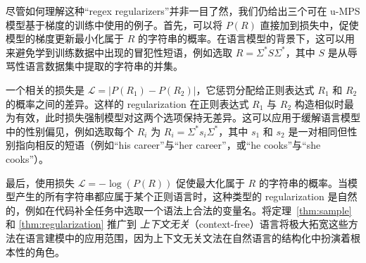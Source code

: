 \documentclass[twoside]{article}
\newcommand{\mc}[1]{\mathcal{#1}}
\begin{document}
尽管如何理解这种``regex regularizers''并非一目了然，我们仍给出三个可在 u-MPS 模型基于梯度的训练中使用的例子。首先，可以将 $P(R)$ 直接加到损失中，促使模型的梯度更新最小化属于 $R$ 的字符串的概率。在语言模型的背景下，这可以用来避免学到训练数据中出现的冒犯性短语，例如选取 $R = \Sigma^* S \Sigma^*$，其中 $S$ 是从辱骂性语言数据集中提取的字符串的并集。

一个相关的损失是 $\mc{L} = |P(R_1) - P(R_2)|$，它惩罚分配给正则表达式 $R_1$ 和 $R_2$ 的概率之间的差异。这样的 regularization 在正则表达式 $R_1$ 与 $R_2$ 构造相似时最为有效，此时损失强制模型对这两个选项保持无差异。这可以应用于缓解语言模型中的性别偏见，例如选取每个 $R_i$ 为 $R_i = \Sigma^* s_i \Sigma^*$，其中 $s_1$ 和 $s_2$ 是一对相同但性别指向相反的短语（例如``his career''与``her career''，或``he cooks''与``she cooks''）。

最后，使用损失 $\mc{L} = -\log(P(R))$ 促使最大化属于 $R$ 的字符串的概率。当模型产生的所有字符串都应属于某个正则语言时，这种类型的 regularization 是自然的，例如在代码补全任务中选取一个语法上合法的变量名。将定理~\ref{thm:sample} 和 \ref{thm:regularization} 推广到 \emph{上下文无关}（context-free）语言将极大拓宽这些方法在语言建模中的应用范围，因为上下文无关文法在自然语言的结构化中扮演着根本性的角色。
\end{document}
